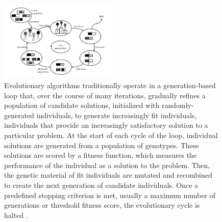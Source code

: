 \begin{figure}
\centering
\includegraphics[width=0.5\textwidth]{img/working_principle_of_EA}
\caption{Evolutionary algorithms traditionally operate in a generation-based loop that, over the course of many iterations, gradually refines a population of candidate solutions, initialized with randomly-generated individuals, to generate increasingly fit individuals, individuals that provide an increasingly satisfactory solution to a particular problem. At the start of each cycle of the loop, individual solutions are generated from a population of genotypes. These solutions are scored by a fitness function, which measures the performance of the individual as a solution to the problem. Then, the genetic material of fit individuals are mutated and recombined to create the next generation of candidate individuals. Once a predefined stopping criterion is met, usually a maximum number of generations or threshold fitness score, the evolutionary cycle is halted \cite{Prothmann2009EvolutionaryOptimisation}.}
\label{fig:working_principle}
\end{figure}